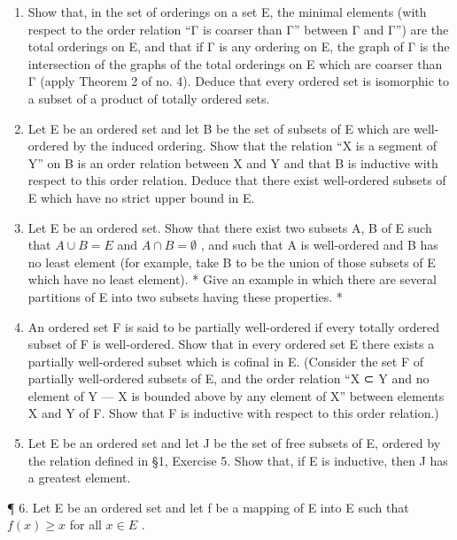 \exercisegroup

\begin{enumerate}
\def\labelenumi{\arabic{enumi}.}
\item
  Show that, in the set of orderings on a set E, the minimal elements (with respect to the order relation ``Γ is coarser than Γ'' between Γ and Γ'') are the total orderings on E, and that if Γ is any ordering on E, the graph of Γ is the intersection of the graphs of the total orderings on E which are coarser than Γ (apply Theorem 2 of no. 4). Deduce that every ordered set is isomorphic to a subset of a product of totally ordered sets.
\item
  Let E be an ordered set and let B be the set of subsets of E which are well-ordered by the induced ordering. Show that the relation ``X is a segment of Y'' on B is an order relation between X and Y and that B is inductive with respect to this order relation. Deduce that there exist well-ordered subsets of E which have no strict upper bound in E.
\item
  Let E be an ordered set. Show that there exist two subsets A, B of E such that \(A \cup B = E\) and \(A \cap B = \emptyset\) , and such that A is well-ordered and B has no least element (for example, take B to be the union of those subsets of E which have no least element). * Give an example in which there are several partitions of E into two subsets having these properties. *
\item
  An ordered set F is said to be partially well-ordered if every totally ordered subset of F is well-ordered. Show that in every ordered set E there exists a partially well-ordered subset which is cofinal in E. (Consider the set F of partially well-ordered subsets of E, and the order relation ``X ⊂ Y and no element of Y --- X is bounded above by any element of X'' between elements X and Y of F. Show that F is inductive with respect to this order relation.)
\item
  Let E be an ordered set and let J be the set of free subsets of E, ordered by the relation defined in §1, Exercise 5. Show that, if E is inductive, then J has a greatest element.
\end{enumerate}

¶ 6. Let E be an ordered set and let f be a mapping of E into E such that \(f(x) \geqslant x\) for all \(x \in E\) .

